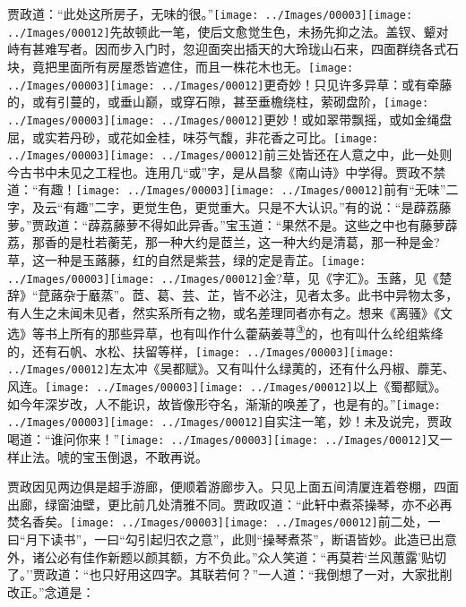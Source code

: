 贾政道：``此处这所房子，无味的很。''{\texttt{[image: ../Images/00003]}\texttt{[image: ../Images/00012]}\footnotesize \kaishu 先故顿此一笔，使后文愈觉生色，未扬先抑之法。盖钗、颦对峙有甚难写者。}因而步入门时，忽迎面突出插天的大玲珑山石来，四面群绕各式石块，竟把里面所有房屋悉皆遮住，而且一株花木也无。{\texttt{[image: ../Images/00003]}\texttt{[image: ../Images/00012]}\footnotesize \kaishu 更奇妙！}只见许多异草：或有牵藤的，或有引蔓的，或垂山巅，或穿石隙，甚至垂檐绕柱，萦砌盘阶，{\texttt{[image: ../Images/00003]}\texttt{[image: ../Images/00012]}\footnotesize \kaishu 更妙！}或如翠带飘摇，或如金绳盘屈，或实若丹砂，或花如金桂，味芬气馥，非花香之可比。{\texttt{[image: ../Images/00003]}\texttt{[image: ../Images/00012]}\footnotesize \kaishu 前三处皆还在人意之中，此一处则今古书中未见之工程也。连用几``或''字，是从昌黎《南山诗》中学得。}贾政不禁道：``有趣！{\texttt{[image: ../Images/00003]}\texttt{[image: ../Images/00012]}\footnotesize \kaishu 前有``无味''二字，及云``有趣''二字，更觉生色，更觉重大。}只是不大认识。''有的说：``是薜荔藤萝。''贾政道：``薜荔藤萝不得如此异香。''宝玉道：``果然不是。这些之中也有藤萝薜荔，那香的是杜若蘅芜，那一种大约是茝兰，这一种大约是清葛，那一种是金?草，这一种是玉蕗藤，红的自然是紫芸，绿的定是青芷。{{\texttt{[image: ../Images/00003]}\texttt{[image: ../Images/00012]}\footnotesize \kaishu 金}?{草，见《字汇》。玉}蕗{，见《楚辞》``}菎蕗{杂于}黀{蒸''。}茝{、葛、芸、芷，皆不必注，见者太多。此书中异物太多，有人生之未闻未见者，然实系所有之物，或名差理同者亦有之。}}想来《离骚》《文选》等书上所有的那些异草，也有叫作什么藿蒳姜荨\href{../Text/part0021_split_000.html\#lnkback_3_a}{\textsuperscript{③}}的，也有叫什么纶组紫绛的，还有石帆、水松、扶留等样，{\texttt{[image: ../Images/00003]}\texttt{[image: ../Images/00012]}\footnotesize \kaishu 左太冲《吴都赋》。}又有叫什么绿荑的，还有什么丹椒、蘼芜、风连。{\texttt{[image: ../Images/00003]}\texttt{[image: ../Images/00012]}\footnotesize \kaishu 以上《蜀都赋》。}如今年深岁改，人不能识，故皆像形夺名，渐渐的唤差了，也是有的。''{\texttt{[image: ../Images/00003]}\texttt{[image: ../Images/00012]}\footnotesize \kaishu 自实注一笔，妙！}未及说完，贾政喝道：``谁问你来！''{\texttt{[image: ../Images/00003]}\texttt{[image: ../Images/00012]}\footnotesize \kaishu 又一样止法。}唬的宝玉倒退，不敢再说。

贾政因见两边俱是超手游廊，便顺着游廊步入。只见上面五间清厦连着卷棚，四面出廊，绿窗油壁，更比前几处清雅不同。贾政叹道：``此轩中煮茶操琴，亦不必再焚名香矣。{\texttt{[image: ../Images/00003]}\texttt{[image: ../Images/00012]}\footnotesize \kaishu 前二处，一曰``月下读书''，一曰``勾引起归农之意''，此则``操琴煮茶''，断语皆妙。}此造已出意外，诸公必有佳作新题以颜其额，方不负此。''众人笑道：``再莫若`兰风蕙露'贴切了。''贾政道：``也只好用这四字。其联若何？''一人道：``我倒想了一对，大家批削改正。''念道是：

